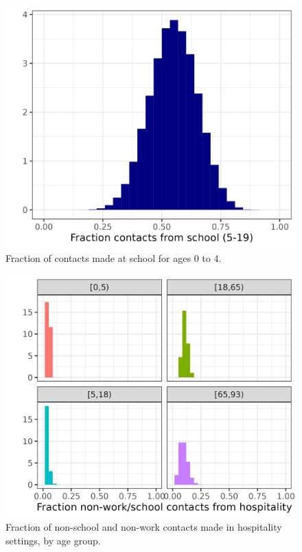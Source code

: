 \documentclass[
]{article}
\begin{document}
\begin{figure}
\includegraphics[width=25in]{README_files/figure-gfm/school2frac} \caption{Fraction of contacts made at school for ages 0 to 4.}\label{fig:school2frac}
\end{figure}

\begin{figure}
\includegraphics[width=25in]{README_files/figure-gfm/hospfrac} \caption{Fraction of non-school and non-work contacts made in hospitality settings, by age group.}\label{fig:hospfrac}
\end{figure}
\end{document}
